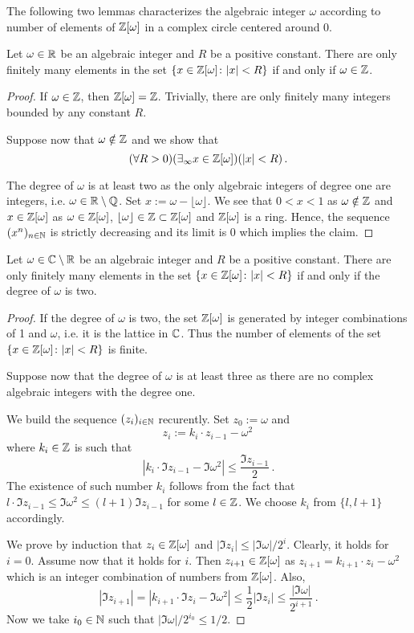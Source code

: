 The following two lemmas characterizes the algebraic integer $\omega$ according to number of elements of $\mathbb{Z}[\omega]$ in a complex circle centered around 0. 
\begin{lem}
Let $\omega\in\mathbb{R}$ be an algebraic integer and $R$ be a positive constant. There are only finitely many elements in the set $\left\{x \in\mathbb{Z}[\omega] \colon |x|<R \right\}$ if and only if $\omega \in \mathbb{Z}$. 
\end{lem}
\begin{proof}
If $\omega \in \mathbb{Z}$, then $\mathbb{Z}[\omega] = \mathbb{Z}$. Trivially, there are only finitely many integers bounded by any constant $R$.

Suppose now that $\omega \notin \mathbb{Z}$ and we show that 
$$
(\forall R>0) (\exists_\infty x\in \mathbb{Z}[\omega])(|x|<R)\,.
$$ 

The degree of $\omega$ is at least two as the only algebraic integers of degree one are integers, i.e. $\omega \in \mathbb{R} \setminus \mathbb{Q}$. 
Set $x:= \omega- \lfloor \omega \rfloor$. We see that $0<x<1$ as $\omega \notin \mathbb{Z}$ and $x \in \mathbb{Z}[\omega]$ as $\omega \in \mathbb{Z}[\omega]$, $\lfloor \omega \rfloor \in  \mathbb{Z}\subset\mathbb{Z}[\omega]$ and $\mathbb{Z}[\omega]$ is a ring. 
Hence, the sequence $(x^n)_{n\in \mathbb{N}}$ is strictly decreasing and its limit is 0 which implies the claim.
\end{proof}


\begin{lem}
Let $\omega\in \mathbb{C}\setminus\mathbb{R}$ be an algebraic integer and $R$ be a positive constant. There are only finitely many elements in the set $\left\{x \in\mathbb{Z}[\omega] \colon |x|<R\right\}$ if and only if the degree of $\omega$ is two.  
\end{lem}
\begin{proof}
If the degree of $\omega$ is two, the set $\mathbb{Z}[\omega]$ is generated by integer combinations of 1 and $\omega$, i.e. it is the lattice in $\mathbb{C}$. Thus the number of elements of the set $\left\{x \in\mathbb{Z}[\omega] \colon |x|<R\right\}$ is finite.

Suppose now that the degree of $\omega$ is at least three as there are no complex algebraic integers with the degree one. 

We build the sequence $(z_i)_{i\in\mathbb{N}}$ recurently. Set $z_0:=\omega$ and
$$
z_i:=k_i \cdot z_{i-1}-\omega^2\, 
$$
where $k_i\in\mathbb{Z}$ is such that 
$$
|k_i \cdot\Im z_{i-1}-\Im \omega^2|\leq \frac{\Im z_{i-1}}{2}\,.
$$
The existence of such number $k_i$ follows from the fact that $l\cdot \Im z_{i-1}\leq \Im \omega^2 \leq(l+1)\Im z_{i-1} $ for some $l\in\mathbb{Z}$. We choose $k_i$ from $\{l,l+1\}$ accordingly.

We prove by induction that $z_i \in \mathbb{Z}[\omega]$ and $|\Im z_i|\leq |\Im \omega|/2^i$. Clearly, it holds for $i=0$. Assume now that it holds for $i$. Then $z_{i+1}\in\mathbb{Z}[\omega]$ as $z_{i+1}=k_{i+1} \cdot z_{i}-\omega^2$ which is an integer combination of numbers from $\mathbb{Z}[\omega]$. Also,
$$
|\Im z_{i+1}|= |k_{i+1} \cdot \Im z_{i}- \Im\omega^2|\leq \frac{1}{2}|\Im z_i|\leq \frac{|\Im \omega|}{2^{i+1}}\,. 
$$
Now we take $i_0\in\mathbb{N}$ such that $|\Im \omega|/2^{i_0}\leq 1/2$.  
\end{proof}


